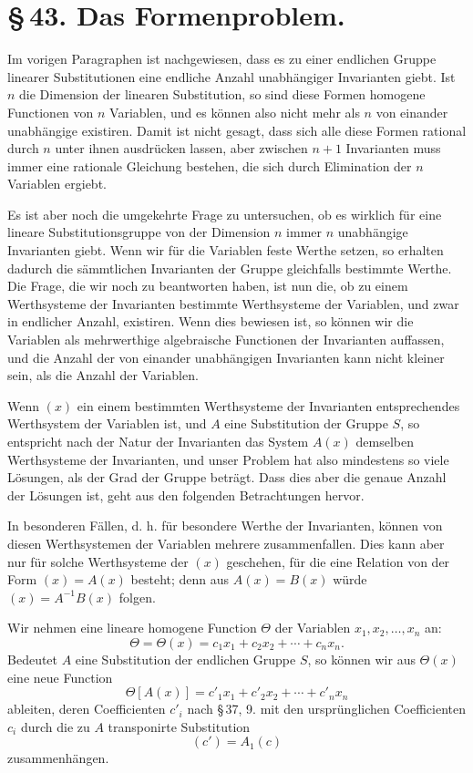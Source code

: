 \documentclass[11pt]{article}
\begin{document}
\section*{\S\,43. Das Formenproblem.}

Im vorigen Paragraphen ist nachgewiesen, dass es zu einer endlichen Gruppe linearer Substitutionen eine endliche Anzahl unabhängiger Invarianten giebt. Ist $n$ die Dimension der linearen Substitution, so sind diese Formen homogene Functionen von $n$ Variablen, und es können also nicht mehr als $n$ von einander unabhängige existiren. Damit ist nicht gesagt, dass sich alle diese Formen rational durch $n$ unter ihnen ausdrücken lassen, aber zwischen $n+1$ Invarianten muss immer eine rationale Gleichung bestehen, die sich durch Elimination der $n$ Variablen ergiebt.

Es ist aber noch die umgekehrte Frage zu untersuchen, ob es wirklich für eine lineare Substitutionsgruppe von der Dimension $n$ immer $n$ unabhängige Invarianten giebt. Wenn wir für die Variablen feste Werthe setzen, so erhalten dadurch die sämmtlichen Invarianten der Gruppe gleichfalls bestimmte Werthe. Die Frage, die wir noch zu beantworten haben, ist nun die, ob zu einem Werthsysteme der Invarianten bestimmte Werthsysteme der Variablen, und zwar in endlicher Anzahl, existiren. Wenn dies bewiesen ist, so können wir die Variablen als mehrwerthige algebraische Functionen der Invarianten auffassen, und die Anzahl der von einander unabhängigen Invarianten kann nicht kleiner sein, als die Anzahl der Variablen.

Wenn $(x)$ ein einem bestimmten Werthsysteme der Invarianten entsprechendes Werthsystem der Variablen ist, und $A$ eine Substitution der Gruppe $S$, so entspricht nach der Natur der Invarianten das System $A(x)$ demselben Werthsysteme der Invarianten, und unser Problem hat also mindestens so viele Lösungen, als der Grad der Gruppe beträgt. Dass dies aber die genaue Anzahl der Lösungen ist, geht aus den folgenden Betrachtungen hervor.

In besonderen Fällen, d. h. für besondere Werthe der Invarianten, können von diesen Werthsystemen der Variablen mehrere zusammenfallen. Dies kann aber nur für solche Werthsysteme der $(x)$ geschehen, für die eine Relation von der Form $(x)=A(x)$ besteht; denn aus $A(x)=B(x)$ würde $(x)=A^{-1}B(x)$ folgen.

Wir nehmen eine lineare homogene Function $\Theta$ der Variablen $x_1,x_2,\ldots,x_n$ an:
\begin{equation}
\Theta=\Theta(x)=c_1x_1+c_2x_2+\cdots+c_nx_n.
\tag{1}
\end{equation}
Bedeutet $A$ eine Substitution der endlichen Gruppe $S$, so können wir aus $\Theta(x)$ eine neue Function
\begin{equation}
\Theta[A(x)]=c'_1x_1+c'_2x_2+\cdots+c'_nx_n
\tag{2}
\end{equation}
ableiten, deren Coefficienten $c'_i$ nach \S\,37, 9. mit den ursprünglichen Coefficienten $c_i$ durch die zu $A$ transponirte Substitution
\[
(c')=A_1(c)
\]
zusammenhängen.
\end{document}
